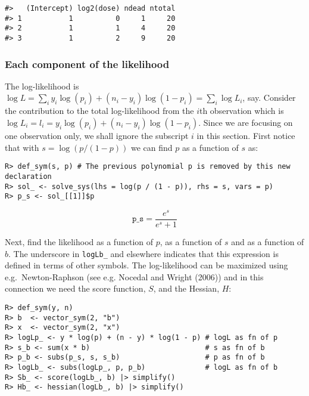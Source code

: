 \begin{verbatim}
#>   (Intercept) log2(dose) ndead ntotal
#> 1           1          0     1     20
#> 2           1          1     4     20
#> 3           1          2     9     20
\end{verbatim}

\hypertarget{each-component-of-the-likelihood}{%
\subsubsection{Each component of the likelihood}\label{each-component-of-the-likelihood}}

The log-likelihood is \(\log L=\sum_i y_i \log(p_i) + (n_i-y_i) \log(1-p_i) = \sum_i \log L_i\), say.
Consider the contribution to the total log-likelihood from the \(i\)th
observation which is \(\log L_i = l_i = y_i \log(p_i) + (n_i-y_i) \log(1-p_i)\).
Since we are focusing on one observation only, we shall ignore the
subscript \(i\) in this section. First notice that with
\(s = \log(p/(1-p))\) we can find \(p\) as a function of \(s\) as:

\begin{verbatim}
R> def_sym(s, p) # The previous polynomial p is removed by this new declaration
R> sol_ <- solve_sys(lhs = log(p / (1 - p)), rhs = s, vars = p)
R> p_s <- sol_[[1]]$p
\end{verbatim}

\begin{equation}
\texttt{p\_s} = \frac{e^{s}}{e^{s} + 1}
\end{equation}

Next, find the likelihood as a function of \(p\), as a function of \(s\)
and as a function of \(b\). The underscore in \texttt{logLb\_} and elsewhere
indicates that this expression is defined in terms of other
symbols. The log-likelihood can be maximized using e.g.~Newton-Raphson
(see e.g. Nocedal and Wright (2006)) and in this connection we need the score function,
\(S\), and the Hessian, \(H\):

\begin{verbatim}
R> def_sym(y, n)
R> b  <- vector_sym(2, "b")
R> x  <- vector_sym(2, "x")
R> logLp_ <- y * log(p) + (n - y) * log(1 - p) # logL as fn of p
R> s_b <- sum(x * b)                           # s as fn of b
R> p_b <- subs(p_s, s, s_b)                    # p as fn of b
R> logLb_ <- subs(logLp_, p, p_b)              # logL as fn of b
R> Sb_ <- score(logLb_, b) |> simplify()
R> Hb_ <- hessian(logLb_, b) |> simplify()
\end{verbatim}

